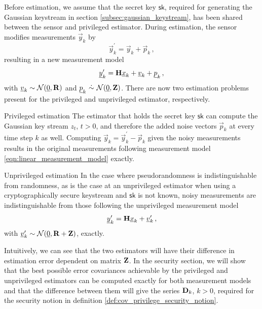 \documentclass[letterpaper, 10 pt, conference]{ieeeconf}
\begin{document}
Before estimation, we assume that the secret key $\mathsf{sk}$, required for generating the Gaussian keystream in section \ref{subsec:gaussian_keystream}, has been shared between the sensor and privileged estimator. During estimation, the sensor modifies measurements $\vec{y}_k$ by
\begin{equation}\label{eqn:modified_measurement}
   \vec{y}^\prime_k = \vec{y}_k + \vec{p}_k\,,
\end{equation}
resulting in a new measurement model
\begin{equation}
   {\underline{y}}^\prime_k = {{\mathbf{H}}}{\underline{x}}_k + {\underline{v}}_k + {\underline{p}}_k\,,
\end{equation}
with ${\underline{v}}_k\sim \mathcal{N}({\underline{0}},{{\mathbf{R}}})$ and $\vec{p}_k\ \dot{\sim}\ \mathcal{N}(\vec{0},\mat{Z})$. There are now two estimation problems present for the privileged and unprivileged estimator, respectively.
\begin{LaTeXdescription}
   \item[Privileged estimation] The estimator that holds the secret key $\mathsf{sk}$ can compute the Gaussian key stream $z_t$, $t>0$, and therefore the added noise vectors $\vec{p}_k$ at every time step $k$ as well. Computing $\vec{y}_k = \vec{y}^\prime_k - \vec{p}_k$ given the noisy measurements results in the original measurements following measurement model \eqref{eqn:linear_measurement_model} exactly.
   \item[Unprivileged estimation] In the case where pseudorandomness is indistinguishable from randomness, as is the case at an unprivileged estimator when using a cryptographically secure keystream and $\mathsf{sk}$ is not known, noisy measurements are indistinguishable from those following the unprivileged measurement model 
   \begin{equation}\label{eqn:unprivileged_measurement_model}
      {\underline{y}}^\prime_k = {{\mathbf{H}}}{\underline{x}}_k + {\underline{v}}^\prime_k\,,
   \end{equation}
   with ${\underline{v}}^\prime_k\sim \mathcal{N}({\underline{0}},{{\mathbf{R}}}+{{\mathbf{Z}}})$, exactly.
\end{LaTeXdescription}

Intuitively, we can see that the two estimators will have their difference in estimation error dependent on matrix ${{\mathbf{Z}}}$. In the security section, we will show that the best possible error covariances achievable by the privileged and unprivileged estimators can be computed exactly for both measurement models and that the difference between them will give the series ${{\mathbf{D}}}_k$, $k>0$, required for the security notion in definition \ref{def:cov_privilege_security_notion}.
\end{document}
